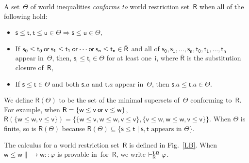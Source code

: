 A set~$\Theta$ of world inequalities
\textit{conforms to} world restriction set~$\mathsf R$ when all of the
following hold:
\begin{itemize}
 \item $\mathsf s\le \mathsf t, \mathsf t\le \mathsf u\in
       \Theta\Longrightarrow
       \mathsf s\le \mathsf u\in\Theta$,
 \item If $\mathsf{s_0}\le \mathsf{t_0} \mathbin{\mathsf{or}} \mathsf{s_1}\le \mathsf
       {t_1}\mathbin{\mathsf{or}}
       \cdots\mathbin{\mathsf{or}} \mathsf{s_n}\le
       \mathsf{t_n}\in \bar{\mathsf R}$ and all of
       $\mathsf{s_0},\mathsf{s_1},\ldots,\mathsf{s_n},
       \mathsf{t_0},\mathsf{t_1},\ldots, \mathsf{t_n}$ appear in~$\Theta$, then,
       $\mathsf{s_i}\le \mathsf{t_i}\in\Theta$ for at least
       one~$\mathsf{i}$, where $\bar {\mathsf R}$ is the substitution
       closure of~$\mathsf R$,
 \item If $\mathsf s\le\mathsf t\in\Theta$ and both $\mathsf s.a$ and
       $\mathsf t.a$ appear in~$\Theta$, then $\mathsf s.a\le\mathsf
       t.a\in \Theta$.
\end{itemize}
We define $\mathsf R(\Theta)$ to be the set of the minimal
supersets of~$\Theta$ conforming to~$\mathsf R$.
For example, when $\mathsf R=\{\mathsf w\le \mathsf v\mathbin{\mathsf{or}}\mathsf v\le \mathsf
w\}$,
$\mathsf R(\{\mathsf w\le \mathsf w, \mathsf v\le \mathsf v\}) =
\{\{\mathsf w\le \mathsf v, \mathsf w\le \mathsf w, \mathsf v \le
\mathsf v\}, \{\mathsf v \le
\mathsf w, \mathsf w\le \mathsf w, \mathsf v\le \mathsf v\}\}$\enspace.
 When $\Theta$ is finite, so is $\mathsf R(\Theta)$ because $\mathsf
 R(\Theta)\subseteq \{\mathsf s\le\mathsf
 t\mid\mathsf s,\mathsf t\mbox{ appears in }\Theta\}$.

\begin{definition}
 The calculus\,\LB\,for a world restriction set~$\mathsf R$ is defined in Fig.~\ref{LB}.
 When $\mathsf w\le \mathsf w\parallel \rightarrow \mathsf
 w::\varphi$ is provable in \LB\,for~$\mathsf R$,
 we write $\vdashRLB\varphi$.
\end{definition}

